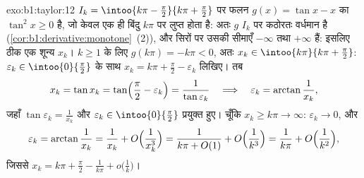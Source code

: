 \begin{solution}{exo:b1:taylor:12}
$I_k = \intoo{k\pi - \frac\pi2}{k\pi + \frac\pi2}$ पर फलन $g(x) = \tan x -
x$ का  $\tan^2 x \geq 0$ है, जो केवल एक ही बिंदु $k\pi$ पर लुप्त होता
है: अतः $g$ $I_k$ पर कठोरतः वर्धमान है
(\cref{cor:b1:derivative:monotone}~(2)), और सिरों पर उसकी सीमाएँ $-\infty$
तथा $+\infty$ हैं: इसलिए ठीक एक शून्य $x_k$। $k \geq 1$ के लिए $g(k\pi) =
-k\pi < 0$, अतः $x_k \in \intoo{k\pi}{k\pi + \frac\pi2}$: $\varepsilon_k \in
\intoo{0}{\frac\pi2}$ के साथ $x_k = k\pi + \frac\pi2 - \varepsilon_k$ लिखिए।
तब
\[
x_k = \tan x_k = \tan\Bigl(\frac\pi2 - \varepsilon_k\Bigr)
= \frac{1}{\tan\varepsilon_k}
\quad\Longrightarrow\quad
\varepsilon_k = \arctan\frac{1}{x_k} ,
\]
जहाँ $\tan\varepsilon_k = \frac{1}{x_k}$ और $\varepsilon_k \in
\intoo{0}{\frac\pi2}$ प्रयुक्त हुए। चूँकि $x_k \geq k\pi \to \infty$:
$\varepsilon_k \to 0$, और
\[
\varepsilon_k = \arctan\frac{1}{x_k} = \frac{1}{x_k} +
O\Bigl(\frac{1}{x_k^3}\Bigr)
= \frac{1}{k\pi + O(1)} + O\Bigl(\frac{1}{k^3}\Bigr)
= \frac{1}{k\pi} + O\Bigl(\frac{1}{k^2}\Bigr) ,
\]
जिससे $x_k = k\pi + \frac\pi2 - \frac{1}{k\pi} + o\bigl(\frac1k\bigr)$।
\end{solution}


